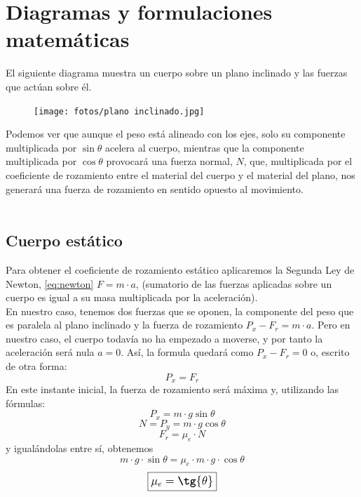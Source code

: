 \documentclass{article}
\begin{document}
\clearpage

\section{Diagramas y formulaciones matemáticas}

El siguiente diagrama muestra un cuerpo sobre un plano inclinado y las fuerzas que actúan sobre él. 

\begin{figure}[h]
\centering
\texttt{[image: fotos/plano inclinado.jpg]}
\end{figure}

Podemos ver que aunque el peso está alineado con los ejes, solo su componente multiplicada por $\sin{\theta}$ acelera al cuerpo, mientras que la componente multiplicada por $\cos{\theta}$ provocará una fuerza normal, $N$, que, multiplicada por el coeficiente de rozamiento entre el material del cuerpo y el material del plano, nos generará una fuerza de rozamiento en sentido opuesto al movimiento.\\\\


\subsection{Cuerpo estático}
Para obtener el coeficiente de rozamiento estático aplicaremos la Segunda Ley de Newton, \eqref{eq:newton} $F = m \cdot a$, (sumatorio de las fuerzas aplicadas sobre un cuerpo es igual a su masa multiplicada por la aceleración). \\ En nuestro caso, tenemos dos fuerzas que se oponen, la componente del peso que es paralela al plano inclinado y la fuerza de rozamiento $P_x - F_r = m \cdot a$. Pero en nuestro caso, el cuerpo todavía no ha empezado a moverse, y por tanto la aceleración será nula $a = 0$. Así, la formula quedará como $P_x - F_r = 0$ o, escrito de otra forma:
\[ \boxed{P_x = F_r} \]
En este instante inicial, la fuerza de rozamiento será máxima y, utilizando las fórmulas:
\[ P_x = m \cdot g \sin{\theta} \]
\[ N = P_y = m \cdot g \cos{\theta} \]
\[ F_r = \mu_e \cdot N\]
y igualándolas entre sí, obtenemos
\[ m \cdot g \cdot \sin{\theta} = \mu_e \cdot m \cdot g \cdot \cos{\theta}\]
\[ \textbf{\large{\boxed{\mu_e = \tg{\theta}}}} \]

\clearpage
\end{document}
